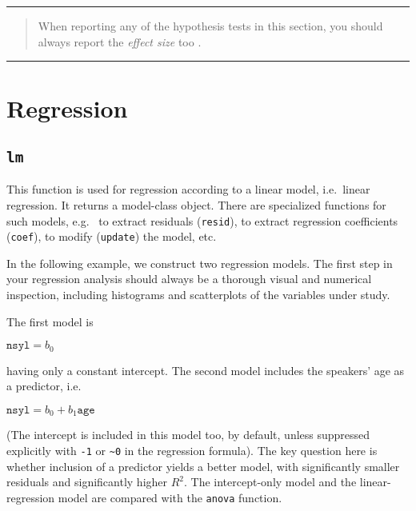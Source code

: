 \documentclass[
]{book}
\begin{document}
\begin{center}\rule{0.5\linewidth}{0.5pt}\end{center}

\begin{quote}
When reporting any of the hypothesis tests in this section, you should always report the \emph{effect size} too \citep{quene10}.
\end{quote}

\begin{center}\rule{0.5\linewidth}{0.5pt}\end{center}

\hypertarget{ch-regression}{%
\chapter{Regression}\label{ch-regression}}

\hypertarget{lm}{%
\section{\texorpdfstring{\texttt{lm}}{lm}}\label{lm}}

This function is used for regression according to a linear model,
i.e.~linear regression. It returns a model-class object. There are
specialized functions for such models, e.g.~
to extract residuals (\texttt{resid}),
to extract regression coefficients (\texttt{coef}),
to modify (\texttt{update}) the model, etc.

In the following example, we construct two regression models.
The first step in your regression analysis should always be a thorough visual and numerical inspection, including histograms and scatterplots of the variables under
study.

The first model is

\(\texttt{nsyl} = b_0\)

having only a
constant intercept. The second model includes the speakers' age as a
predictor, i.e.~

\(\texttt{nsyl} = b_0 + b_1 \texttt{age}\)

(The intercept is included in this model too, by default, unless
suppressed explicitly with \texttt{-1} or
\texttt{\textasciitilde{}0} in the regression formula). The key
question here is whether inclusion of a predictor yields a better
model, with significantly smaller residuals and significantly higher
\(R^2\). The intercept-only model and the linear-regression model are
compared with the \texttt{anova} function.
\end{document}
